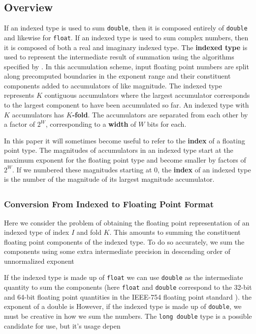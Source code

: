 \documentclass[12pt]{article}
\begin{document}
  \subsection{Overview}
If an indexed type is used to sum \verb|double|, then it is composed entirely of \verb|double| and likewise for \verb|float|. If an indexed type is used to sum complex numbers, then it is composed of both a real and imaginary indexed type.
    The \textbf{indexed type} is used to represent the intermediate result of summation using the algorithms specified by \cite{parallelreproduciblesummation}. In this accumulation scheme, input floating point numbers are split along precomputed boundaries in the exponent range and their constituent components added to accumulators of like magnitude. The indexed type represents $K$ contiguous accumulators where the largest accumulator corresponds to the largest component to have been accumulated so far. An indexed type with $K$ accumulators has \textbf{$K$-fold}. The accumulators are separated from each other by a factor of $2^W$, corresponding to a \textbf{width} of $W$ bits for each.


    In this paper it will sometimes become useful to refer to the \textbf{index} of a floating point type. The magnitudes of accumulators in an indexed type start at the maximum exponent for the floating point type and become smaller by factors of $2^W$. If we numbered these magnitudes starting at 0, the \textbf{index} of an indexed type is the number of the magnitude of its largest magnitude accumulator.
  \subsection{}
    
  \subsubsection{Conversion From Indexed to Floating Point Format}
    Here we consider the problem of obtaining the floating point representation of an indexed type of index $I$ and fold $K$. This amounts to summing the constituent floating point components of the indexed type. To do so accurately, we sum the components using some extra intermediate precision in descending order of unnormalized exponent
    
    If the indexed type is made up of \verb|float| we can use \verb|double| as the intermediate quantity to sum the components (here \verb|float| and \verb|double| correspond to the 32-bit and 64-bit floating point quantities in the IEEE-754 floating point standard \cite{ieee754}). the exponent of a double is However, if the indexed type is made up of \verb|double|, we must be creative in how we sum the numbers. The \verb|long double| type is a possible candidate for use, but it's usage depen
\end{document}
